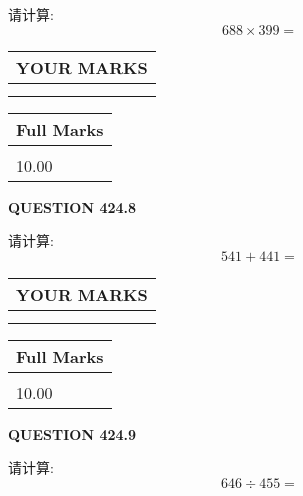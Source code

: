 \documentclass{ctexart}
\begin{document}
  
 
请计算:
\begin{equation}
688  \times    %
399 = \nonumber
\end{equation}
 

 

 
  
\vspace{0.2in}
  
\noindent\begin{tabular}{|l|}
\hline
 YOUR MARKS  \\
\hline
 \\ 
 \\ 
\hline
\end{tabular}
\hspace{0.05in} \begin{tabular}{|l|}
\hline
 Full Marks  \\
\hline
 \\ 
10.00 \\
\hline
\end{tabular}
{\textbf{\Large{QUESTION
424.8 
}}}
  
  
 
请计算:
\begin{equation}
541 +  %
441 = \nonumber
\end{equation}
 

 

 
  
\vspace{0.2in}
  
\noindent\begin{tabular}{|l|}
\hline
 YOUR MARKS  \\
\hline
 \\ 
 \\ 
\hline
\end{tabular}
\hspace{0.05in} \begin{tabular}{|l|}
\hline
 Full Marks  \\
\hline
 \\ 
10.00 \\
\hline
\end{tabular}
{\textbf{\Large{QUESTION
424.9 
}}}
  
  
 
请计算:
\begin{equation}
646  \div    %
455 = \nonumber
\end{equation}
 

 

 
  
\end{document}
